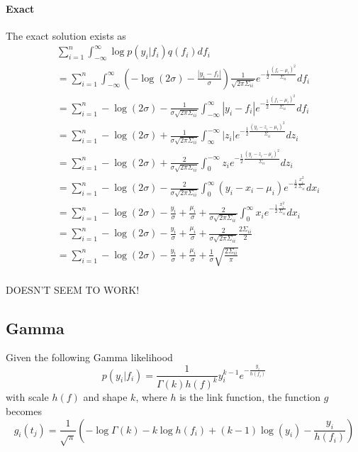 \documentclass[5p,11pt]{article}
\begin{document}
\paragraph{Exact} The exact solution exists as
\begin{equation}
    \begin{aligned}
    &\sum_{i=1}^n \int_{-\infty}^\infty \log p(y_i|f_i) q(f_i) df_i\\
    &= \sum_{i=1}^n \int_{-\infty}^\infty \left( -\log(2\sigma) - \frac{|y_i-f_i|}{\sigma} \right) \frac{1}{\sqrt{2\pi\Sigma_{ii}}} e^{-\frac{1}{2}\frac{(f_i-\mu_i)^2}{\Sigma_{ii}}} df_i\\
    &= \sum_{i=1}^n -\log(2\sigma) - \frac{1}{\sigma\sqrt{2\pi\Sigma_{ii}}} \int_{-\infty}^\infty |y_i-f_i|e^{-\frac{1}{2}\frac{(f_i-\mu_i)^2}{\Sigma_{ii}}} df_i \\
    &= \sum_{i=1}^n -\log(2\sigma) + \frac{1}{\sigma\sqrt{2\pi\Sigma_{ii}}} \int_{\infty}^{-\infty} |z_i|e^{-\frac{1}{2}\frac{(y_i-z_i-\mu_i)^2}{\Sigma_{ii}}} dz_i \\
    &= \sum_{i=1}^n -\log(2\sigma) + \frac{2}{\sigma\sqrt{2\pi\Sigma_{ii}}} \int_0^{-\infty} z_i e^{-\frac{1}{2}\frac{(y_i-z_i-\mu_i)^2}{\Sigma_{ii}}} dz_i \\
    &= \sum_{i=1}^n -\log(2\sigma) - \frac{2}{\sigma\sqrt{2\pi\Sigma_{ii}}} \int_0^\infty (y_i - x_i - \mu_i) e^{-\frac{1}{2}\frac{x_i^2}{\Sigma_{ii}}} dx_i \\
    &= \sum_{i=1}^n -\log(2\sigma) - \frac{y_i}{\sigma} + \frac{\mu_i}{\sigma} + \frac{2}{\sigma\sqrt{2\pi\Sigma_{ii}}} \int_0^\infty x_i e^{-\frac{1}{2}\frac{x_i^2}{\Sigma_{ii}}} dx_i \\
    &= \sum_{i=1}^n -\log(2\sigma) - \frac{y_i}{\sigma} + \frac{\mu_i}{\sigma} + \frac{2}{\sigma\sqrt{2\pi\Sigma_{ii}}} \frac{2\Sigma_{ii}}{2} \\
    &= \sum_{i=1}^n -\log(2\sigma) - \frac{y_i}{\sigma} + \frac{\mu_i}{\sigma} + \frac{1}{\sigma}\sqrt{\frac{2\Sigma_{ii}}{\pi}} \\
    \end{aligned}
\end{equation}

DOESN'T SEEM TO WORK!

\subsection{Gamma}
Given the following Gamma likelihood
$$ p(y_i|f_i) = \frac{1}{\Gamma(k)h(f)^k} y_i^{k-1} e^{-\frac{y_i}{h(f_i)}} $$
with scale $h(f)$ and shape $k$, where $h$ is the link function, the function $g$ becomes
$$ g_i(t_j) = \frac{1}{\sqrt{\pi}} \left( -\log \Gamma(k) - k\log{h(f_i)} + (k-1)\log(y_i) - \frac{y_i}{h(f_i)} \right) $$
\end{document}
